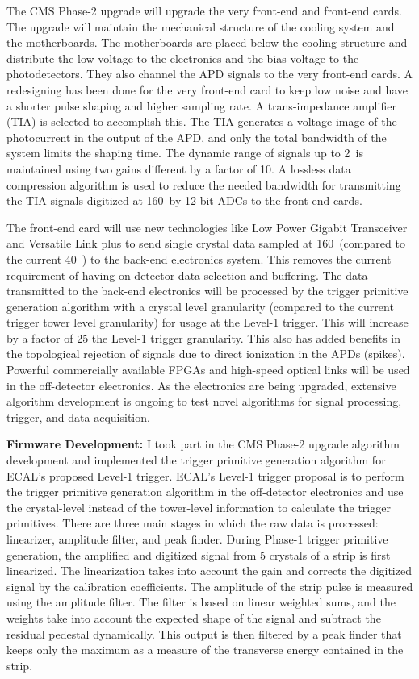 The CMS Phase-2 upgrade will upgrade the very front-end and front-end cards. The upgrade will maintain the mechanical structure of the cooling system and the motherboards. The motherboards are placed below the cooling structure and distribute the low voltage to the electronics and the bias voltage to the photodetectors. They also channel the APD signals to the very front-end cards. A redesigning has been done for the very front-end card to keep low noise and have a shorter pulse shaping and higher sampling rate. A trans-impedance amplifier (TIA) is selected to accomplish this. The TIA generates a voltage image of the photocurrent in the output of the APD, and only the total bandwidth of the system limits the shaping time. The dynamic range of signals up to 2~\TeV is maintained using two gains different by a factor of 10. A lossless data compression algorithm is used to reduce the needed bandwidth for transmitting the TIA signals digitized at 160~\mhz by 12-bit ADCs to the front-end cards.

The front-end card will use new technologies like Low Power Gigabit Transceiver and Versatile Link plus to send single crystal data sampled at 160~\mhz (compared to the current 40~\mhz) to the back-end electronics system. This removes the current requirement of having on-detector data selection and buffering. The data transmitted to the back-end electronics will be processed by the trigger primitive generation algorithm with a crystal level granularity (compared to the current trigger tower level granularity) for usage at the Level-1 trigger. This will increase by a factor of 25 the Level-1 trigger granularity. This also has added benefits in the topological rejection of signals due to direct ionization in the APDs (spikes). Powerful commercially available FPGAs and high-speed optical links will be used in the off-detector electronics. As the electronics are being upgraded, extensive algorithm development is ongoing to test novel algorithms for signal processing, trigger, and data acquisition.

\textbf{Firmware Development:} I took part in the CMS Phase-2 upgrade algorithm development and implemented the trigger primitive generation algorithm for ECAL's proposed Level-1 trigger. ECAL's Level-1 trigger proposal is to perform the trigger primitive generation algorithm in the off-detector electronics and use the crystal-level instead of the tower-level information to calculate the trigger primitives. There are three main stages in which the raw data is processed: linearizer, amplitude filter, and peak finder. During Phase-1 trigger primitive generation, the amplified and digitized signal from 5 crystals of a strip is first linearized. The linearization takes into account the gain and corrects the digitized signal by the calibration coefficients. The amplitude of the strip pulse is measured using the amplitude filter. The filter is based on linear weighted sums, and the weights take into account the expected shape of the signal and subtract the residual pedestal dynamically. This output is then filtered by a peak finder that keeps only the maximum as a measure of the transverse energy contained in the strip.

